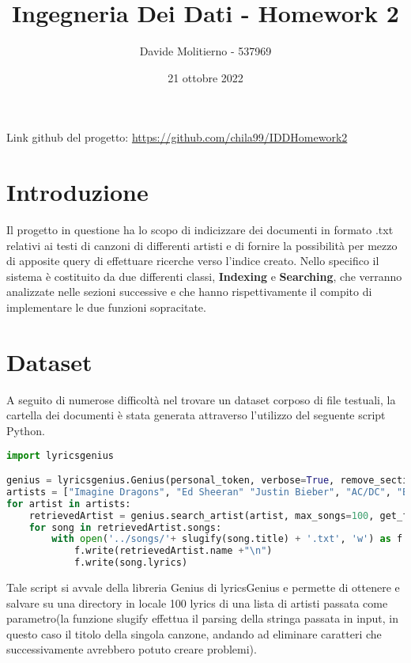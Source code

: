 \documentclass[12pt, letterpaper]{article}
\title{Ingegneria Dei Dati - Homework 2}
\author{Davide Molitierno - 537969}
\date{21 ottobre 2022}
\begin{document}
\maketitle
Link github del progetto: \url{https://github.com/chila99/IDDHomework2}
\section{Introduzione}
Il progetto in questione ha lo scopo di indicizzare dei documenti in formato .txt relativi ai testi di canzoni di differenti artisti e di fornire la possibilità per mezzo di apposite query di effettuare ricerche verso l'indice creato. Nello specifico il sistema è costituito da due differenti classi, \textbf{Indexing} e \textbf{Searching}, che verranno analizzate nelle sezioni successive e che hanno rispettivamente il compito di implementare le due funzioni sopracitate.
\section{Dataset}
A seguito di numerose difficoltà nel trovare un dataset corposo di file testuali, la cartella dei documenti è stata generata attraverso l'utilizzo del seguente script Python.
\begin{lstlisting}[language=Python]
import lyricsgenius

genius = lyricsgenius.Genius(personal_token, verbose=True, remove_section_headers=True, skip_non_songs=True, retries=5, timeout=120)
artists = ["Imagine Dragons", "Ed Sheeran" "Justin Bieber", "AC/DC", "Bad Bunny", "Beyonce", "Tiziano Ferro"]
for artist in artists:
    retrievedArtist = genius.search_artist(artist, max_songs=100, get_full_info=False)
    for song in retrievedArtist.songs:
        with open('../songs/'+ slugify(song.title) + '.txt', 'w') as f:
            f.write(retrievedArtist.name +"\n")
            f.write(song.lyrics)
\end{lstlisting}
Tale script si avvale della libreria Genius di lyricsGenius e permette di ottenere e salvare su una directory in locale 100 lyrics di una lista di artisti passata come parametro(la funzione slugify effettua il parsing della stringa passata in input, in questo caso il titolo della singola canzone, andando ad eliminare caratteri che successivamente avrebbero potuto creare problemi).
\end{document}
